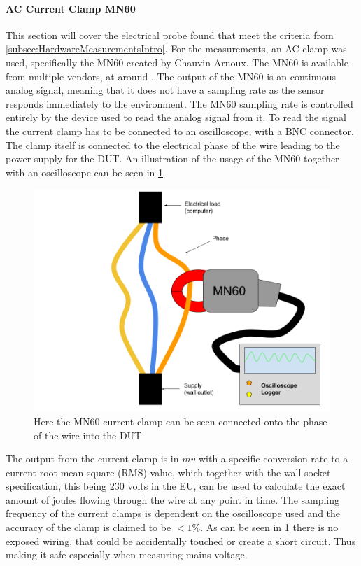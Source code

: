 \paragraph*{AC Current Clamp MN60}

This section will cover the electrical probe found that meet the criteria from \cref{subsec:HardwareMeasurementsIntro}. For the measurements, an AC clamp was used, specifically the MN60 created by Chauvin Arnoux\cite{ChauvinArnoux}. The MN60 is available from multiple vendors, at around . The output of the MN60 is an continuous analog signal, meaning that it does not have a sampling rate as the sensor responds immediately to the environment\cite{agarwal2005foundations}. The MN60 sampling rate is controlled entirely by the device used to read the analog signal from it\cite{agarwal2005foundations}. To read the signal the current clamp has to be connected to an oscilloscope, with a BNC connector\cite{ClampDoc}. The clamp itself is connected to the electrical phase of the wire leading to the power supply for the DUT. An illustration of the usage of the MN60 together with an oscilloscope can be seen in \cref{fig:clampSetup}

\begin{figure}[ht]
    \centering
    \includegraphics*[scale=0.25]{figures/CLAMP.png}
    \caption{Here the MN60 current clamp can be seen connected onto the phase of the wire into the DUT}
    \label{fig:clampSetup}
\end{figure}

The output from the current clamp is in $mv$ with a specific conversion rate to a current root mean square (RMS) value, which together with the wall socket specification, this being 230 volts in the EU\cite{sik}, can be used to calculate the exact amount of joules flowing through the wire at any point in time. The sampling frequency of the current clamps is dependent on the oscilloscope used and the accuracy of the clamp is claimed to be $<1\%$\cite{ClampDoc}. As can be seen in \ref{fig:clampSetup} there is no exposed wiring, that could be accidentally touched or create a short circuit. Thus making it safe especially when measuring mains voltage.


